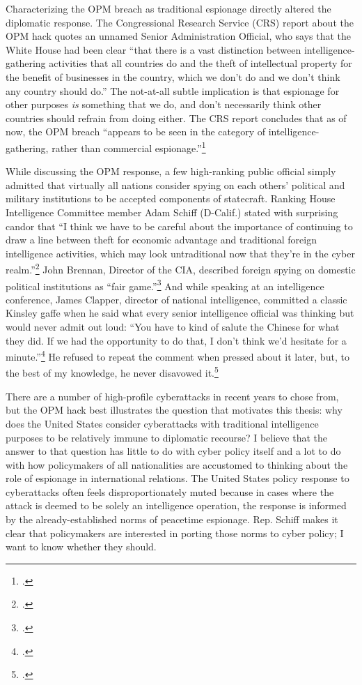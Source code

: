\documentclass{memoir}
\begin{document}
\begin{refsegment}
Characterizing the OPM breach as traditional espionage directly altered the diplomatic response. The Congressional Research Service (CRS) report about the OPM hack quotes an unnamed Senior Administration Official, who says that the White House had been clear ``that there is a vast distinction between intelligence-gathering activities that all countries do and the theft of intellectual property for the benefit of businesses in the country, which we don't do and we don't think any country should do.'' The not-at-all subtle implication is that espionage for other purposes \emph{is} something that we do, and don't necessarily think other countries should refrain from doing either. The CRS report concludes that as of now, the OPM breach ``appears to be seen in the category of intelligence-gathering, rather than commercial espionage.''\footcite{finklea_cyber_2015}

While discussing the OPM response, a few high-ranking public official simply admitted that virtually all nations consider spying on each others' political and military institutions to be accepted components of statecraft. Ranking House Intelligence Committee member Adam Schiff (D-Calif.) stated with surprising candor that ``I think we have to be careful about the importance of continuing to draw a line between theft for economic advantage and traditional foreign intelligence activities, which may look untraditional now that they’re in the cyber realm.''\footcite{nakashima_hacks_2015} John Brennan, Director of the CIA, described foreign spying on domestic political institutions as ``fair game.''\footcite{sanger_u.s._2016} And while speaking at an intelligence conference, James Clapper, director of national intelligence, committed a classic Kinsley gaffe when he said what every senior intelligence official was thinking but would never admit out loud: ``You have to kind of salute the Chinese for what they did. If we had the opportunity to do that, I don't think we'd hesitate for a minute.''\footcite{pepitone_clapper_2015} He refused to repeat the comment when pressed about it later, but, to the best of my knowledge, he never disavowed it.\footcite{sanger_u.s._2015}

There are a number of high-profile cyberattacks in recent years to chose from, but the OPM hack best illustrates the question that motivates this thesis: why does the United States consider cyberattacks with traditional intelligence purposes to be relatively immune to diplomatic recourse? I believe that the answer to that question has little to do with cyber policy itself and a lot to do with how policymakers of all nationalities are accustomed to thinking about the role of espionage in international relations. The United States policy response to cyberattacks often feels disproportionately muted because in cases where the attack is deemed to be solely an intelligence operation, the response is informed by the already-established norms of peacetime espionage. Rep. Schiff makes it clear that policymakers are interested in porting those norms to cyber policy; I want to know whether they should.


\end{refsegment}
\end{document}

